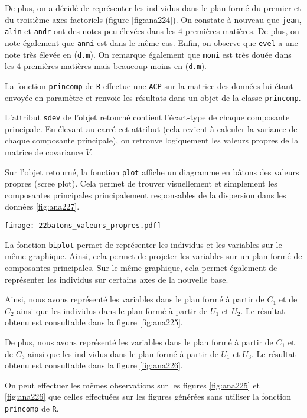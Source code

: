 \documentclass{article}
\begin{document}
\begin{multicols}{2}
De plus, on a décidé de représenter les individus dans le plan formé du premier et du troisième axes factoriels (figure \ref{fig:ana224}). On constate à nouveau que \texttt{jean}, \texttt{alin} et \texttt{andr} ont des notes peu élevées dans les $4$ premières matières. De plus, on note également que \texttt{anni} est dans le même cas. Enfin, on observe que \texttt{evel} a une note très élevée en (\texttt{d.m}). On remarque également que \texttt{moni} est très douée dans les $4$ premières matières mais beaucoup moins en (\texttt{d.m}).

La fonction \texttt{princomp} de \texttt{R} effectue une \texttt{ACP} sur la matrice des données lui étant envoyée en paramètre et renvoie les résultats dans un objet de la classe \texttt{princomp}.

L'attribut \texttt{sdev} de l'objet retourné contient l'écart-type de chaque composante principale. En élevant au carré cet attribut (cela revient à calculer la variance de chaque composante principale), on retrouve logiquement les valeurs propres de la matrice de covariance $V$.

Sur l'objet retourné, la fonction \texttt{plot} affiche un diagramme en bâtons des valeurs propres (scree plot). Cela permet de trouver visuellement et simplement les composantes principales principalement responsables de la dispersion dans les données \ref{fig:ana227}.

\begingroup
    \centering
   \texttt{[image: 22batons\_valeurs\_propres.pdf]}
    \label{fig:ana227}
\endgroup

La fonction \texttt{biplot} permet de représenter les individus et les variables sur le même graphique. Ainsi, cela permet de projeter les variables sur un plan formé de composantes principales. Sur le même graphique, cela permet également de représenter les individus sur certains axes de la nouvelle base.

Ainsi, nous avons représenté les variables dans le plan formé à partir de $C_1$ et de $C_2$ ainsi que les individus dans le plan formé à partir de $U_1$ et $U_2$. Le résultat obtenu est consultable dans la figure \ref{fig:ana225}. 

De plus, nous avons représenté les variables dans le plan formé à partir de $C_1$ et de $C_3$ ainsi que les individus dans le plan formé à partir de $U_1$ et $U_3$. Le résultat obtenu est consultable dans la figure \ref{fig:ana226}.

On peut effectuer les mêmes observations sur les figures \ref{fig:ana225} et \ref{fig:ana226} que celles effectuées sur les figures générées sans utiliser la fonction \texttt{princomp} de \texttt{R}.


\end{multicols}
\end{document}
